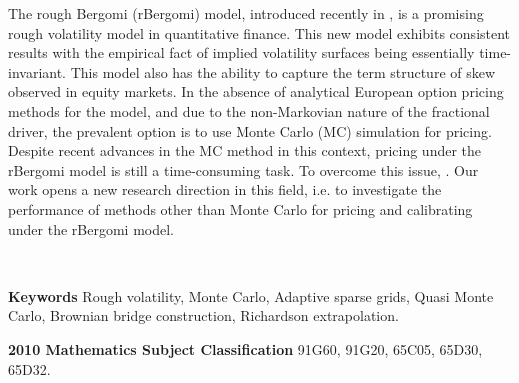 The rough Bergomi (rBergomi) model, introduced recently in  \cite{bayer2016pricing}, is a promising rough volatility model in quantitative finance. This new model exhibits consistent results with the empirical fact of implied volatility surfaces being essentially time-invariant. This model also has  the  ability to capture the term structure of skew observed in equity markets. In the absence of analytical European option pricing methods for the model, and due to the non-Markovian nature of the fractional driver, the prevalent option is to use Monte Carlo (MC) simulation for pricing. Despite recent advances in the MC method in this context, pricing under the rBergomi model is still a time-consuming task. To overcome this issue, . Our work opens a new research direction in this field, i.e. to investigate the performance of  methods  other than Monte Carlo for pricing and calibrating under the rBergomi model.

\

\textbf{Keywords} Rough volatility, Monte Carlo, Adaptive sparse grids, Quasi Monte Carlo, Brownian bridge construction, Richardson extrapolation.

\textbf{2010 Mathematics Subject Classification} 	91G60, 	91G20, 65C05, 65D30, 65D32.